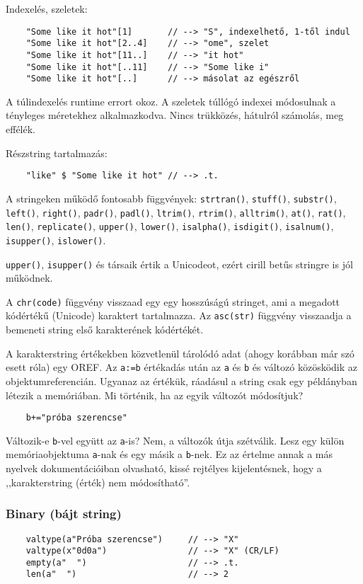 Indexelés, szeletek:
\begin{verbatim}
    "Some like it hot"[1]       // --> "S", indexelhető, 1-től indul
    "Some like it hot"[2..4]    // --> "ome", szelet
    "Some like it hot"[11..]    // --> "it hot"
    "Some like it hot"[..11]    // --> "Some like i"
    "Some like it hot"[..]      // --> másolat az egészről
\end{verbatim}
A túlindexelés runtime errort okoz. 
A szeletek túllógó indexei módosulnak a tényleges méretekhez alkalmazkodva. 
Nincs trükközés, hátulról számolás, meg effélék.

Részstring tartalmazás:
\begin{verbatim}
    "like" $ "Some like it hot" // --> .t.
\end{verbatim}


A stringeken működő fontosabb függvények: 
\verb!strtran()!, 
\verb!stuff()!, 
\verb!substr()!, 
\verb!left()!, 
\verb!right()!, 
\verb!padr()!,
\verb!padl()!, 
\verb!ltrim()!, 
\verb!rtrim()!, 
\verb!alltrim()!, 
\verb!at()!, 
\verb!rat()!, 
\verb!len()!, 
\verb!replicate()!,
\verb!upper()!,
\verb!lower()!,
\verb!isalpha()!,
\verb!isdigit()!,
\verb!isalnum()!,
\verb!isupper()!,
\verb!islower()!.

\verb!upper()!, \verb!isupper()! és társaik értik a Unicodeot, 
ezért cirill betűs stringre is jól működnek.

A \verb!chr(code)! függvény visszaad egy egy hosszúságú stringet,
ami a megadott kódértékű (Unicode) karaktert tartalmazza.
Az \verb!asc(str)! függvény visszaadja a bemeneti string első karakterének
kódértékét.


A karakterstring értékekben közvetlenül tárolódó adat 
(ahogy korábban már szó esett róla) egy OREF. Az \verb!a:=b!
értékadás után az \verb!a! és \verb!b! és változó közösködik
az objektumreferencián. Ugyanaz az értékük, ráadásul a string csak egy 
példányban létezik a memóriában. Mi történik, ha az egyik változót módosítjuk?
\begin{verbatim}
    b+="próba szerencse"
\end{verbatim}
Változik-e \verb!b!-vel együtt az \verb!a!-is? Nem, a változók útja szétválik.
Lesz egy külön memóriaobjektuma \verb!a!-nak és egy másik a \verb!b!-nek.
Ez az értelme annak a más nyelvek dokumentációiban olvasható, kissé rejtélyes
kijelentésnek, hogy a ,,karakterstring (érték) nem módosítható''. 


\subsubsection{Binary (bájt string)}
\begin{verbatim}
    valtype(a"Próba szerencse")     // --> "X"
    valtype(x"0d0a")                // --> "X" (CR/LF)
    empty(a"  ")                    // --> .t.
    len(a"  ")                      // --> 2
\end{verbatim}


